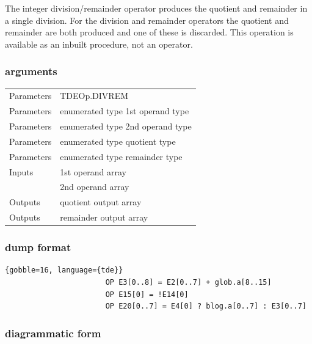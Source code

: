                 The integer division/remainder operator produces the quotient and
                remainder in a single division. For the division and remainder
                operators the quotient and remainder are both produced and
                one of these is discarded.
                This operation is available as an inbuilt procedure, not an
                operator.

            \subsubsection{arguments}
            
                \begin{tabular}{| l | l |}
                \hline
                Parameters  & TDEOp.DIVREM \\
                Parameters  & enumerated type 1st operand type \\
                Parameters  & enumerated type 2nd operand type \\
                Parameters  & enumerated type quotient type \\
                Parameters  & enumerated type remainder type \\
                \hline
                Inputs      & 1st operand array \\
                            & 2nd operand array \\
                \hline
                Outputs     & quotient output array \\
                Outputs     & remainder output array \\
                \hline
                \end{tabular}

            \subsubsection{dump format}
            
                \begin{lstlisting}{gobble=16, language={tde}}
                       OP E3[0..8] = E2[0..7] + glob.a[8..15]
                       OP E15[0] = !E14[0]
                       OP E20[0..7] = E4[0] ? blog.a[0..7] : E3[0..7]
                \end{lstlisting}

            \subsubsection{diagrammatic form}


